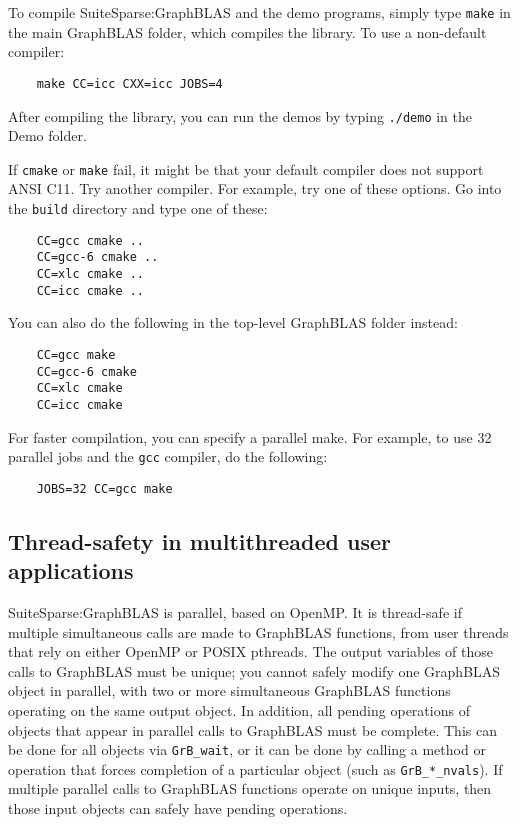 \documentclass[12pt]{article}
\begin{document}
To compile SuiteSparse:GraphBLAS and the demo programs, simply type \verb'make'
in the main GraphBLAS folder, which compiles the library.  To use a
non-default compiler:

    {\small
    \begin{verbatim}
    make CC=icc CXX=icc JOBS=4 \end{verbatim} }

After compiling the library, you can run the demos by typing \verb'./demo'
in the Demo folder.

If \verb'cmake' or \verb'make' fail, it might be that your default compiler
does not support ANSI C11.  Try another compiler.  For example, try one of
these options.  Go into the \verb'build' directory and type one of these:

    {\small
    \begin{verbatim}
    CC=gcc cmake ..
    CC=gcc-6 cmake ..
    CC=xlc cmake ..
    CC=icc cmake ..  \end{verbatim} }

You can also do the following in the top-level GraphBLAS folder instead:

    {\small
    \begin{verbatim}
    CC=gcc make
    CC=gcc-6 cmake
    CC=xlc cmake
    CC=icc cmake \end{verbatim} }

For faster compilation, you can specify a parallel make.  For example,
to use 32 parallel jobs and the \verb'gcc' compiler, do the following:

    {\small
    \begin{verbatim}
    JOBS=32 CC=gcc make \end{verbatim} }

\subsection{Thread-safety in multithreaded user applications}
\label{sec:threads}

SuiteSparse:GraphBLAS is parallel, based on OpenMP.  It is thread-safe if
multiple simultaneous calls are made to GraphBLAS functions, from user threads
that rely on either OpenMP or POSIX pthreads.  The output variables of those
calls to GraphBLAS must be unique; you cannot safely modify one GraphBLAS
object in parallel, with two or more simultaneous GraphBLAS functions operating
on the same output object.  In addition, all pending operations of objects that
appear in parallel calls to GraphBLAS must be complete.  This can be done for
all objects via \verb'GrB_wait', or it can be done by calling a method or
operation that forces completion of a particular object (such as
\verb'GrB_*_nvals').  If multiple parallel calls to GraphBLAS functions operate
on unique inputs, then those input objects can safely have pending operations.
\end{document}
